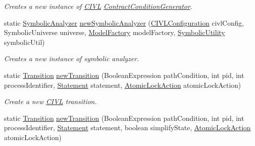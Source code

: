 \begin{DoxyCompactItemize}
\begin{DoxyCompactList}\small\item\em Creates a new instance of \hyperlink{classedu_1_1udel_1_1cis_1_1vsl_1_1civl_1_1CIVL}{C\+I\+V\+L} \hyperlink{interfaceedu_1_1udel_1_1cis_1_1vsl_1_1civl_1_1semantics_1_1IF_1_1ContractConditionGenerator}{Contract\+Condition\+Generator}. \end{DoxyCompactList}\item 
static \hyperlink{interfaceedu_1_1udel_1_1cis_1_1vsl_1_1civl_1_1semantics_1_1IF_1_1SymbolicAnalyzer}{Symbolic\+Analyzer} \hyperlink{classedu_1_1udel_1_1cis_1_1vsl_1_1civl_1_1semantics_1_1IF_1_1Semantics_a5d4f7ad65bb0eb6872bdfbd5fc37ae22}{new\+Symbolic\+Analyzer} (\hyperlink{classedu_1_1udel_1_1cis_1_1vsl_1_1civl_1_1config_1_1IF_1_1CIVLConfiguration}{C\+I\+V\+L\+Configuration} civl\+Config, Symbolic\+Universe universe, \hyperlink{interfaceedu_1_1udel_1_1cis_1_1vsl_1_1civl_1_1model_1_1IF_1_1ModelFactory}{Model\+Factory} model\+Factory, \hyperlink{interfaceedu_1_1udel_1_1cis_1_1vsl_1_1civl_1_1dynamic_1_1IF_1_1SymbolicUtility}{Symbolic\+Utility} symbolic\+Util)
\begin{DoxyCompactList}\small\item\em Creates a new instance of symbolic analyzer. \end{DoxyCompactList}\item 
static \hyperlink{interfaceedu_1_1udel_1_1cis_1_1vsl_1_1civl_1_1semantics_1_1IF_1_1Transition}{Transition} \hyperlink{classedu_1_1udel_1_1cis_1_1vsl_1_1civl_1_1semantics_1_1IF_1_1Semantics_a654fd8ee662f5d2719f237f1c793f41f}{new\+Transition} (Boolean\+Expression path\+Condition, int pid, int process\+Identifier, \hyperlink{interfaceedu_1_1udel_1_1cis_1_1vsl_1_1civl_1_1model_1_1IF_1_1statement_1_1Statement}{Statement} statement, \hyperlink{enumedu_1_1udel_1_1cis_1_1vsl_1_1civl_1_1semantics_1_1IF_1_1Transition_1_1AtomicLockAction}{Atomic\+Lock\+Action} atomic\+Lock\+Action)
\begin{DoxyCompactList}\small\item\em Create a new \hyperlink{classedu_1_1udel_1_1cis_1_1vsl_1_1civl_1_1CIVL}{C\+I\+V\+L} transition. \end{DoxyCompactList}\item 
static \hyperlink{interfaceedu_1_1udel_1_1cis_1_1vsl_1_1civl_1_1semantics_1_1IF_1_1Transition}{Transition} \hyperlink{classedu_1_1udel_1_1cis_1_1vsl_1_1civl_1_1semantics_1_1IF_1_1Semantics_af88ed6fcd3f46651e087a76ff4a5ee3d}{new\+Transition} (Boolean\+Expression path\+Condition, int pid, int process\+Identifier, \hyperlink{interfaceedu_1_1udel_1_1cis_1_1vsl_1_1civl_1_1model_1_1IF_1_1statement_1_1Statement}{Statement} statement, boolean simplify\+State, \hyperlink{enumedu_1_1udel_1_1cis_1_1vsl_1_1civl_1_1semantics_1_1IF_1_1Transition_1_1AtomicLockAction}{Atomic\+Lock\+Action} atomic\+Lock\+Action)

\end{DoxyCompactItemize}
